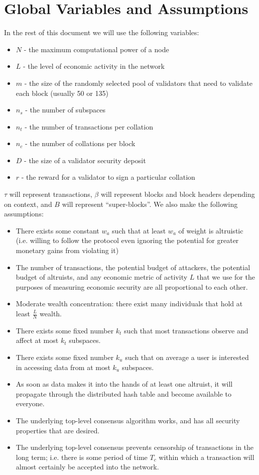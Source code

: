 \documentclass[11pt,a4paper]{article}
\makeatletter
\theoremstyle{plain}
\theoremstyle{definition}
\theoremstyle{remark}
\newcommand{\ie}{i.e.\@\xspace}
\makeatother
\begin{document}
\section{Global Variables and Assumptions}

In the rest of this document we will use the following variables:

\begin{itemize}
\item
$N$ - the maximum computational power of a node
\item
$L$ - the level of economic activity in the network
\item
$m$ - the size of the randomly selected pool of validators that need to validate each block (usually 50 or 135)
\item
$n_s$ - the number of subspaces
\item
$n_t$ - the number of transactions per collation
\item
$n_c$ - the number of collations per block
\item
$D$ - the size of a validator security deposit
\item
$r$ - the reward for a validator to sign a particular collation
\end{itemize}

$\tau$ will represent transactions, $\beta$ will represent blocks and block headers depending on context, and $B$ will represent ``super-blocks''. We also make the following assumptions:

\begin{itemize}
\item
There exists some constant $w_a$ such that at least $w_a$ of weight is altruistic (\ie willing to follow the protocol even ignoring the potential for greater monetary gains from violating it)
\item
The number of transactions, the potential budget of attackers, the potential budget of altruists, and any economic metric of activity $L$ that we use for the purposes of measuring economic security are all proportional to each other.
\item
Moderate wealth concentration: there exist many individuals that hold at least $\frac{L}{N}$ wealth.
\item
There exists some fixed number $k_t$ such that most transactions observe and affect at most $k_t$ subspaces.
\item
There exists some fixed number $k_u$ such that on average a user is interested in accessing data from at most $k_u$ subspaces.
\item
As soon as data makes it into the hands of at least one altruist, it will propagate through the distributed hash table and become available to everyone.
\item
The underlying top-level consensus algorithm works, and has all security properties that are desired.
\item
The underlying top-level consensus prevents censorship of transactions in the long term; \ie there is some period of time $T_c$ within which a transaction will almost certainly be accepted into the network.
\end{itemize}
\end{document}
